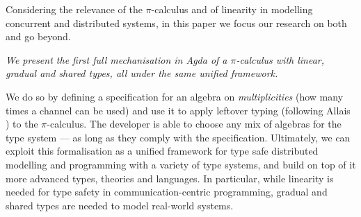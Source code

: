 \documentclass[a4paper,UKenglish,cleveref,autoref,thm-restate,authorcolumns]{lipics-v2019}
\theoremstyle{definition}
\newcommand{\picalc}{$\pi$-calculus}
\begin{document}
Considering the relevance of the \picalc{} and of linearity in modelling concurrent and distributed systems, in this paper we focus our research on both and go beyond.

\emph{We present the first full mechanisation in Agda of a \picalc{} with linear, gradual and shared types, all under the same unified framework.}

We do so by defining a specification for an algebra on \emph{multiplicities} (how many times a channel can be used) and use it to apply leftover typing (following Allais \cite{Allais2018a}) to the \picalc{}.
The developer is able to choose any mix of algebras for the type system --- as long as they comply with the specification.
Ultimately, we can exploit this formalisation as a unified framework for type safe distributed modelling and programming with a variety of type systems, and build on top of it more advanced types, theories and languages.
In particular, while linearity is needed for type safety in communication-centric programming, gradual and shared types are needed to model real-world systems.
\end{document}
